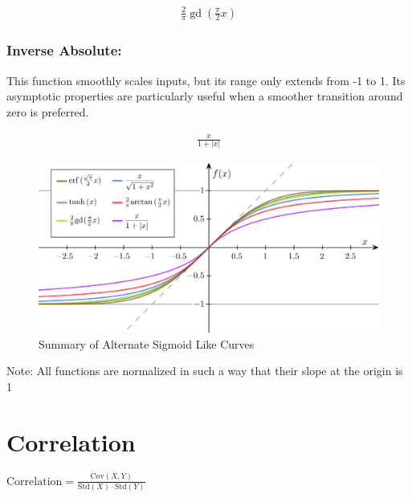 \documentclass[
  12 pt,
  a4paper,
]{book}
\numberwithin{equation}{section}
\theoremstyle{plain}      %
\theoremstyle{definition} %
\theoremstyle{remark}     %
\theoremstyle{note}         %
\begin{document}
\begin{align}
\frac{2}{\pi} \operatorname{gd}\left(\frac{\pi}{2} x\right)
\end{align}

\hypertarget{inverse-absolute}{%
\subsection{Inverse Absolute:}\label{inverse-absolute}}

This function smoothly scales inputs, but its range only extends from -1
to 1. Its asymptotic properties are particularly useful when a smoother
transition around zero is preferred.

\begin{align}
\frac{x}{1+|x|}
\end{align}

\newpage

\begin{figure}[htbp]
    \centering
    \begin{minipage}[t]{1.0\textwidth}
        \centering
        \includegraphics[width=\textwidth]{pictures/Sigmoids_comparisons.jpeg}
        \caption{Summary of Alternate Sigmoid Like Curves}
    \end{minipage}
    \label{fig:sigmoid-layout}
\end{figure}

Note: All functions are normalized in such a way that their slope at the
origin is 1

\newpage

\hypertarget{correlation}{%
\chapter{Correlation}\label{correlation}}

\begin{center}
\colorbox{white}{\color{navyimpactblue} \huge $\text{Correlation} = \frac{\text{Cov}(X, Y)}{\text{Std}(X) \cdot \text{Std}(Y)}$}
\end{center}
\end{document}
